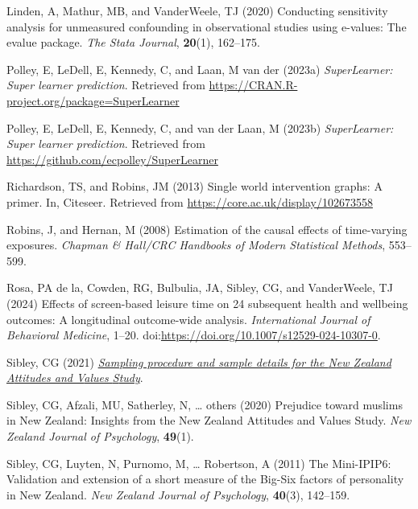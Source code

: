\documentclass[
  single column]{article}
\newlength{\cslhangindent}
\newenvironment{CSLReferences}[2] %
 {\begin{list}{}{%
  \setlength{\itemindent}{0pt}
  \setlength{\leftmargin}{0pt}
  \setlength{\parsep}{0pt}
  \ifodd #1
   \setlength{\leftmargin}{\cslhangindent}
   \setlength{\itemindent}{-1\cslhangindent}
  \fi
  \setlength{\itemsep}{#2\baselineskip}}}
 {\end{list}}
\begin{document}
\begin{CSLReferences}{1}{0}
Linden, A, Mathur, MB, and VanderWeele, TJ (2020) Conducting sensitivity
analysis for unmeasured confounding in observational studies using
e-values: The evalue package. \emph{The Stata Journal}, \textbf{20}(1),
162--175.

Polley, E, LeDell, E, Kennedy, C, and Laan, M van der (2023a)
\emph{SuperLearner: Super learner prediction}. Retrieved from
\url{https://CRAN.R-project.org/package=SuperLearner}

Polley, E, LeDell, E, Kennedy, C, and van der Laan, M (2023b)
\emph{SuperLearner: Super learner prediction}. Retrieved from
\url{https://github.com/ecpolley/SuperLearner}

Richardson, TS, and Robins, JM (2013) Single world intervention graphs:
A primer. In, Citeseer. Retrieved from
\url{https://core.ac.uk/display/102673558}

Robins, J, and Hernan, M (2008) Estimation of the causal effects of
time-varying exposures. \emph{Chapman \& Hall/CRC Handbooks of Modern
Statistical Methods}, 553--599.

Rosa, PA de la, Cowden, RG, Bulbulia, JA, Sibley, CG, and VanderWeele,
TJ (2024) Effects of screen-based leisure time on 24 subsequent health
and wellbeing outcomes: A longitudinal outcome-wide analysis.
\emph{International Journal of Behavioral Medicine}, 1--20.
doi:\url{https://doi.org/10.1007/s12529-024-10307-0}.

Sibley, CG (2021)
\emph{\href{https://doi.org/10.31234/osf.io/wgqvy}{Sampling procedure
and sample details for the {N}ew {Z}ealand {A}ttitudes and {V}alues
{S}tudy}}.

Sibley, CG, Afzali, MU, Satherley, N, \ldots{} others (2020) Prejudice
toward muslims in {N}ew {Z}ealand: Insights from the {N}ew {Z}ealand
{A}ttitudes and {V}alues {S}tudy. \emph{New Zealand Journal of
Psychology}, \textbf{49}(1).

Sibley, CG, Luyten, N, Purnomo, M, \ldots{} Robertson, A (2011) The
Mini-IPIP6: Validation and extension of a short measure of the Big-Six
factors of personality in {N}ew {Z}ealand. \emph{New Zealand Journal of
Psychology}, \textbf{40}(3), 142--159.


\end{CSLReferences}
\end{document}

